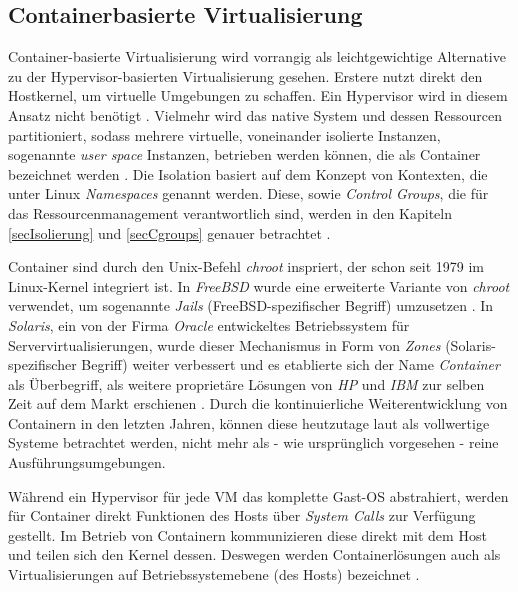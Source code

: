 \documentclass[../main.tex]{subfiles}
\begin{document}

    \subsection{Containerbasierte Virtualisierung}
    \label{introVirtContainer}
      Container-basierte Virtualisierung wird vorrangig als leichtgewichtige Alternative zu der Hypervisor-basierten Virtualisierung gesehen\cite[S.2]{containerVirtPerformance}. Erstere nutzt direkt den Hostkernel, um virtuelle Umgebungen zu schaffen. Ein Hypervisor wird in diesem Ansatz nicht benötigt \cite[S.6+7]{dockerBook}. Vielmehr wird das native System und dessen Ressourcen partitioniert, sodass mehrere virtuelle, voneinander isolierte Instanzen, sogenannte \emph{user space} Instanzen, betrieben werden können, die als Container bezeichnet werden \cite[S.2]{containerVirtPerformance}\cite[S.3]{dockerSecIntro}\cite[S.1]{dockerSec2}. Die Isolation basiert auf dem Konzept von Kontexten, die unter Linux \emph{Namespaces} genannt werden. Diese, sowie \emph{Control Groups}, die für das Ressourcenmanagement verantwortlich sind, werden in den Kapiteln \ref{secIsolierung} und \ref{secCgroups} genauer betrachtet \cite[S.4]{dockerSecIntro}.

      Container sind durch den Unix-Befehl \emph{\acrshort{chroot}} inspriert, der schon seit 1979 im Linux-Kernel integriert ist. In \emph{FreeBSD} wurde eine erweiterte Variante von \emph{chroot} verwendet, um sogenannte \emph{Jails} (FreeBSD-spezifischer Begriff) umzusetzen \cite{jails}. In \emph{Solaris}, ein von der Firma \emph{Oracle} entwickeltes Betriebssystem für Servervirtualisierungen\cite{solaris}, wurde dieser Mechanismus in Form von \emph{Zones} (Solaris-spezifischer Begriff) \cite{zones} weiter verbessert und es etablierte sich der Name \emph{Container} als Überbegriff, als weitere proprietäre Lösungen von \emph{HP} und \emph{IBM} zur selben Zeit auf dem Markt erschienen \cite[S.2]{dockerLXCKub}. Durch die kontinuierliche Weiterentwicklung von Containern in den letzten Jahren, können diese heutzutage laut \cite[S.7]{dockerBook} als vollwertige Systeme betrachtet werden, nicht mehr als - wie ursprünglich vorgesehen - reine Ausführungsumgebungen.

      Während ein Hypervisor für jede \acrshort{VM} das komplette Gast-\acrshort{OS} abstrahiert, werden für Container direkt Funktionen des Hosts über \emph{System Calls} zur Verfügung gestellt. Im Betrieb von Containern kommunizieren diese direkt mit dem Host und teilen sich den Kernel dessen. Deswegen werden Containerlösungen auch als Virtualisierungen auf Betriebssystemebene (des Hosts) bezeichnet \cite[S.6+7]{dockerBook}\cite[S.2]{containerVirtPerformance}\cite[S.3]{dockerLXCKub}.
\end{document}
